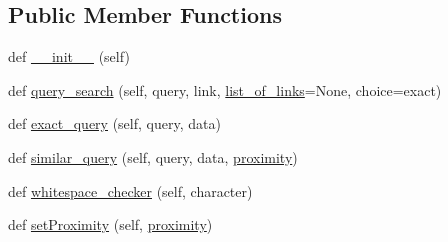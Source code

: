 \subsection*{Public Member Functions}
\begin{DoxyCompactItemize}
\item 
def \hyperlink{classpylinkvalidator_1_1_web_handy_tool_1_1search_1_1search_a938adf672af9ce7a03aa3f1dfc1a4148}{\+\_\+\+\_\+init\+\_\+\+\_\+} (self)
\item 
def \hyperlink{classpylinkvalidator_1_1_web_handy_tool_1_1search_1_1search_aed98782e4a3538c3be75eeb3af8050e5}{query\+\_\+search} (self, query, link, \hyperlink{classpylinkvalidator_1_1_web_handy_tool_1_1search_1_1search_a906e019972fbdaef6ef37b50edc2cb1f}{list\+\_\+of\+\_\+links}=None, choice=\textquotesingle{}exact\textquotesingle{})
\item 
def \hyperlink{classpylinkvalidator_1_1_web_handy_tool_1_1search_1_1search_a2f6e5ce0d893c396139877a60b34d8e9}{exact\+\_\+query} (self, query, data)
\item 
def \hyperlink{classpylinkvalidator_1_1_web_handy_tool_1_1search_1_1search_ad8279fa98fb80bfaae0800cd7c5fa21e}{similar\+\_\+query} (self, query, data, \hyperlink{classpylinkvalidator_1_1_web_handy_tool_1_1search_1_1search_ad4742d4d507c4ea17dd4f4b5881047db}{proximity})
\item 
def \hyperlink{classpylinkvalidator_1_1_web_handy_tool_1_1search_1_1search_a95044af0828393b590c4946fe8aa16b5}{whitespace\+\_\+checker} (self, character)
\item 
def \hyperlink{classpylinkvalidator_1_1_web_handy_tool_1_1search_1_1search_a3070944be3de739d70f8c4c4603cbf4a}{set\+Proximity} (self, \hyperlink{classpylinkvalidator_1_1_web_handy_tool_1_1search_1_1search_ad4742d4d507c4ea17dd4f4b5881047db}{proximity})
\end{DoxyCompactItemize}
